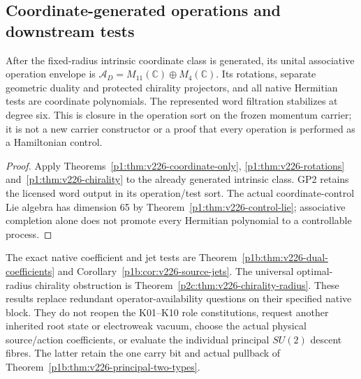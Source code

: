 \documentclass[12pt,a4paper]{article}
\begin{document}
\subsection{Coordinate-generated operations and downstream tests}
\label{p2a:sec:v226-operation-propagation}
\begin{corollary}
\label{p2a:cor:v226-native-operation-closure}
After the fixed-radius intrinsic coordinate class is generated, its unital
associative operation envelope is $\mathcal A_D=M_{11}(\mathbb C)\oplus
M_4(\mathbb C)$. Its rotations, separate geometric duality and protected
chirality projectors, and all native Hermitian tests are coordinate
polynomials. The represented word filtration stabilizes at degree six.
This is closure in the operation sort on the frozen momentum carrier;
it is not a new carrier constructor or a proof that every operation is
performed as a Hamiltonian control.
\end{corollary}
\begin{proof}
Apply Theorems~\ref{p1:thm:v226-coordinate-only},
\ref{p1:thm:v226-rotations} and~\ref{p1:thm:v226-chirality} to the already
generated intrinsic class. GP2 retains the licensed word output in its
operation/test sort. The actual coordinate-control Lie algebra has dimension
65 by Theorem~\ref{p1:thm:v226-control-lie}; associative completion alone
does not promote every Hermitian polynomial to a controllable process.
\end{proof}
The exact native coefficient and jet tests are
Theorem~\ref{p1b:thm:v226-dual-coefficients} and
Corollary~\ref{p1b:cor:v226-source-jets}. The universal optimal-radius
chirality obstruction is Theorem~\ref{p2c:thm:v226-chirality-radius}.
These results replace redundant operator-availability questions on their
specified native block. They do not reopen the K01--K10 role constitutions,
request another inherited root state or electroweak vacuum, choose the actual
physical source/action coefficients, or evaluate the individual principal
$SU(2)$ descent fibres. The latter retain the one carry bit and actual
pullback of Theorem~\ref{p1b:thm:v226-principal-two-types}.
\end{document}
